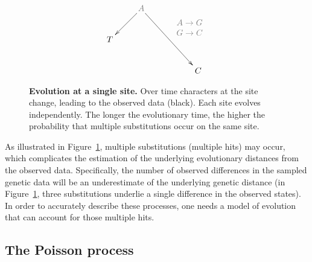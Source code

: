 \begin{figure}[h!]
\centering
\begingroup
\everymath{\displaystyle}
{\Large
\begin{displaymath} %
\xymatrix{
& \color{gray2}A \ar[dl] \ar[drdr]^{ \color{gray2}\begin{array}{c}
A\rightarrow G\\
G\rightarrow C
\end{array}} & & \\
T & & & \\
& & & C \\
}
\end{displaymath}
}%
\endgroup
\caption{
{ \footnotesize 
{\bf Evolution at a single site.} Over time characters at the site change, leading to the observed data (black). 
Each site evolves independently.
The longer the evolutionary time, the higher the probability that multiple substitutions occur on the same site.
}%
}
\label{fig:alignment}
\end{figure}

As illustrated in Figure~\ref{fig:alignment}, multiple substitutions (multiple hits) may occur, which complicates the estimation of the underlying evolutionary distances from the observed data.
Specifically, the number of observed differences in the sampled genetic data will be an underestimate of the underlying genetic distance (in Figure~\ref{fig:alignment}, three substitutions underlie a single difference in the observed states).
In order to accurately describe these processes, one needs a model of evolution that can account for those multiple hits.

\subsection{The Poisson process\label{sub:poisson}}

